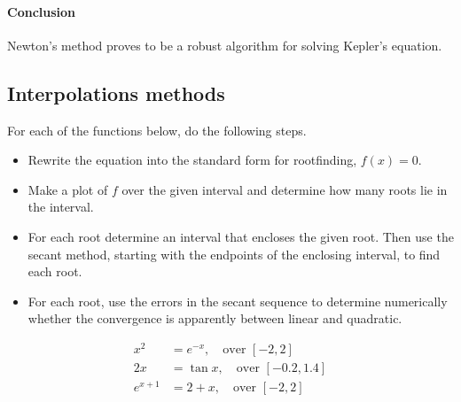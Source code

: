 \begin{solution}
	\paragraph{Conclusion}
	Newton's method proves to be a robust algorithm for solving Kepler's equation.
\end{solution}

\subsection{Interpolations methods}

\begin{exercise}\label{ex:4.3.2}
	For each of the functions below, do the following steps.
	\begin{itemize}
		\item Rewrite the equation into the standard form for rootfinding, $f(x)
			      = 0$.
		\item Make a plot of $f$ over the given interval and determine how many
		      roots lie in the interval.
		\item For each root determine an interval that encloses the given root.
		      Then use the secant method, starting with the endpoints of the
		      enclosing interval, to find each root.
		\item For each root, use the errors in the secant sequence to determine
		      numerically whether the convergence is apparently between linear and
		      quadratic.
	\end{itemize}
	\begin{align*}
		x^2     & = e^{-x}, \quad \text{over } [-2,2]     \\
		2x      & = \tan x, \quad \text{over } [-0.2,1.4] \\
		e^{x+1} & = 2+x, \quad \text{over } [-2,2]
	\end{align*}

\end{exercise}

